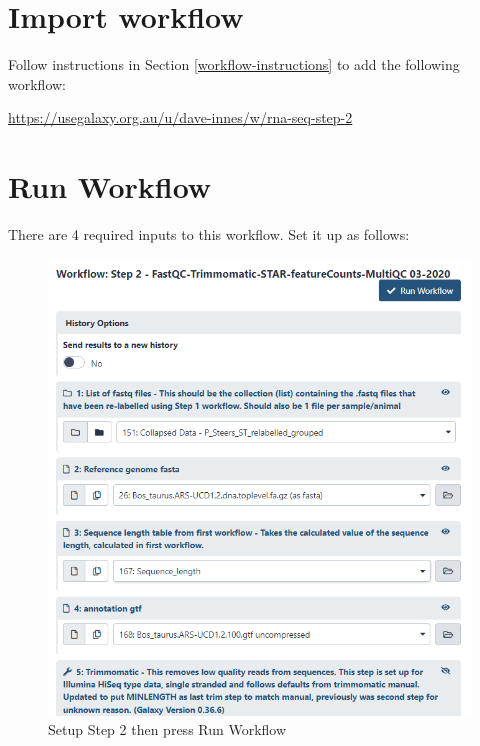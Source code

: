 \documentclass[
]{book}
\begin{document}
\hypertarget{import-workflow}{%
\section{Import workflow}\label{import-workflow}}

Follow instructions in Section \ref{workflow-instructions} to add the following workflow:

\url{https://usegalaxy.org.au/u/dave-innes/w/rna-seq-step-2}

\hypertarget{run-workflow-1}{%
\section{Run Workflow}\label{run-workflow-1}}

There are 4 required inputs to this workflow. Set it up as follows:

\begin{figure}

{\centering \includegraphics[width=1\linewidth]{images/image_step2} 

}

\caption{Setup Step 2 then press Run Workflow}\label{fig:run-workflow-step2}
\end{figure}
\end{document}
